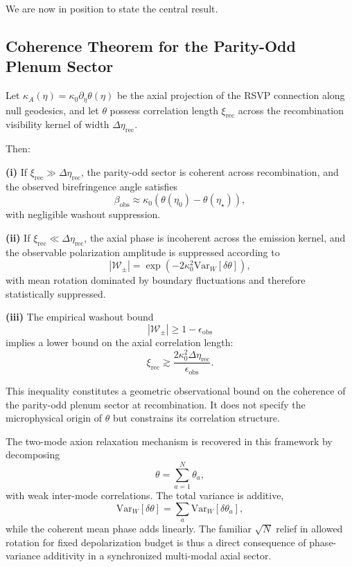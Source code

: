 \documentclass[12pt]{article}
\begin{document}
We are now in position to state the central result.

\subsection*{Coherence Theorem for the Parity-Odd Plenum Sector}

Let $\kappa_A(\eta) = \kappa_0 \partial_\eta \theta(\eta)$ be the axial projection of the RSVP connection along null geodesics, and let $\theta$ possess correlation length $\xi_{\mathrm{rec}}$ across the recombination visibility kernel of width $\Delta\eta_{\mathrm{rec}}$.

Then:

\textbf{(i)} If $\xi_{\mathrm{rec}} \gg \Delta\eta_{\mathrm{rec}}$, the parity-odd sector is coherent across recombination, and the observed birefringence angle satisfies
\begin{equation}
\beta_{\mathrm{obs}}
\approx
\kappa_0
\left(
\theta(\eta_0)
-
\theta(\eta_\star)
\right),
\end{equation}
with negligible washout suppression.

\textbf{(ii)} If $\xi_{\mathrm{rec}} \ll \Delta\eta_{\mathrm{rec}}$, the axial phase is incoherent across the emission kernel, and the observable polarization amplitude is suppressed according to
\begin{equation}
|\mathcal{W}_\pm|
=
\exp
\left(
-2 \kappa_0^2
\mathrm{Var}_W[\delta\theta]
\right),
\end{equation}
with mean rotation dominated by boundary fluctuations and therefore statistically suppressed.

\textbf{(iii)} The empirical washout bound
\begin{equation}
|\mathcal{W}_\pm|
\ge
1 - \epsilon_{\mathrm{obs}}
\end{equation}
implies a lower bound on the axial correlation length:
\begin{equation}
\xi_{\mathrm{rec}}
\gtrsim
\frac{2 \kappa_0^2 \Delta\eta_{\mathrm{rec}}}{\epsilon_{\mathrm{obs}}}.
\end{equation}

This inequality constitutes a geometric observational bound on the coherence of the parity-odd plenum sector at recombination. It does not specify the microphysical origin of $\theta$ but constrains its correlation structure.

\medskip

The two-mode axion relaxation mechanism is recovered in this framework by decomposing
\begin{equation}
\theta
=
\sum_{a=1}^N
\theta_a,
\end{equation}
with weak inter-mode correlations. The total variance is additive,
\begin{equation}
\mathrm{Var}_W[\delta\theta]
=
\sum_a
\mathrm{Var}_W[\delta\theta_a],
\end{equation}
while the coherent mean phase adds linearly. The familiar $\sqrt{N}$ relief in allowed rotation for fixed depolarization budget is thus a direct consequence of phase-variance additivity in a synchronized multi-modal axial sector.
\end{document}

